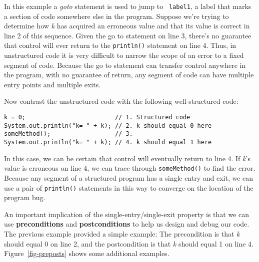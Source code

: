 \noindent 
In this example a {\it goto} statement is used to jump to {\tt
label1}, a label that marks a section of code somewhere else in the
program. Suppose we're trying to determine how {\it k} has acquired an
erroneous value and that its value is correct in line 2 of this
sequence. Given the go to statement on line 3, there's no guarantee
that control will ever return to the {\tt println()} statement on line
4. Thus, in unstructured code it is very difficult to narrow the scope
of an error to a fixed segment of code. Because the go to statement
can transfer control anywhere in the program, with no guarantee of
return, any segment of code can have multiple entry points and
multiple exits.

Now contrast the unstructured code with the following well-structured code:


\begin{jjjlisting}
\begin{lstlisting}
k = 0;                         // 1. Structured code
System.out.println("k= " + k); // 2. k should equal 0 here
someMethod();                  // 3.
System.out.println("k= " + k); // 4. k should equal 1 here
\end{lstlisting}
\end{jjjlisting}

\noindent In this case, we can be certain that control will eventually
return to line 4. If {\it k}'s value is erroneous on line 4, we can trace
through {\tt someMethod()} to find the error. Because any segment
of a structured program has a single entry and exit, we can use
a pair of {\tt println()} statements in this way to converge
on the location of the program bug.

An important implication of the single-entry/single-exit property is
that we can use {\bf preconditions} and {\bf postconditions} to help
us design and debug our code. The previous example provided a simple
example: The precondition is that {\it k} should equal 0 on line 2,
and the postcondition is that {\it k} should equal 1 on line
4. Figure~\ref{fig-preposts} shows some additional examples.

